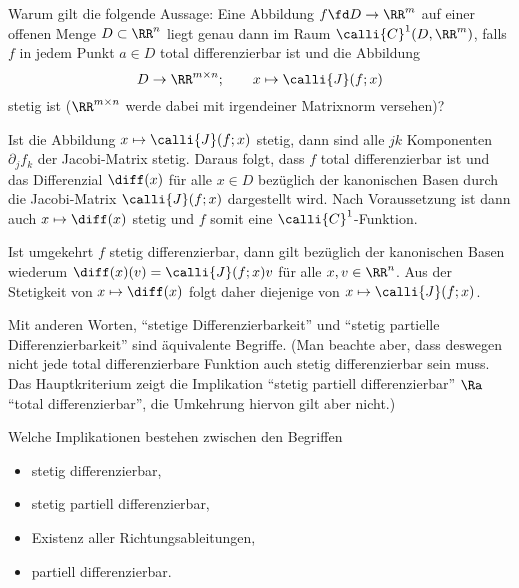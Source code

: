\begin{frage}\label{10_stet}
  Warum gilt die folgende Aussage: Eine Abbildung $f\fd D\to\RR^m$ auf 
  einer offenen Menge $D\subset\RR^n$ liegt genau dann im 
  Raum $\calli{C}^1 (D, \RR^m)$, falls $f$ in jedem Punkt 
  $a\in D$ total differenzierbar ist und die Abbildung 
  \[
  D\to \RR^{m\times n}; \qquad x \mapsto \calli{J} (f; x )
  \]
  stetig ist 
  ($\RR^{m\times n}$ werde dabei mit irgendeiner Matrixnorm versehen)?
\end{frage}

\begin{antwort}
  Ist die Abbildung $x \mapsto \calli{J} (f; x )$ stetig, dann sind  
  alle $jk$ Komponenten $\partial_j f_k$ der Jacobi-Matrix stetig. Daraus 
  folgt, dass $f$ total differenzierbar ist und das Differenzial $\diff (x)$ 
  für alle $x\in D$ bezüglich der kanonischen Basen durch die Jacobi-Matrix 
  $\calli{J}(f;x)$ dargestellt wird. Nach Voraussetzung ist 
  dann auch $x \mapsto \diff (x)$ stetig und $f$ somit eine 
  $\calli{C}^1$-Funktion. 



  Ist umgekehrt $f$ stetig differenzierbar, 
  dann gilt bezüglich der kanonischen Basen wiederum
  $\diff (x) (v) = \calli{J}(f;x) v$ für alle $x,v\in \RR^n$. Aus der 
  Stetigkeit von $x\mapsto \diff (x)$ folgt daher 
  diejenige von $x \mapsto \calli{J}(f;x)$.



  Mit anderen Worten, "`stetige Differenzierbarkeit"' 
  und "`stetig partielle Differenzierbarkeit"' 
  sind äquivalente Begriffe. 
  (Man beachte aber, dass deswegen nicht jede total differenzierbare Funktion 
  auch stetig differenzierbar sein muss. Das Hauptkriterium 
  zeigt die Implikation "`stetig partiell differenzierbar"' $\Ra$ 
  "`total differenzierbar"', die Umkehrung hiervon gilt aber nicht.)  
  \AntEnd
\end{antwort}

\begin{frage}
  Welche Implikationen bestehen zwischen den Begriffen
  {\setlength{\labelsep}{4mm}
    \begin{itemize}
    \item[\desc{i}] stetig differenzierbar,
    \item[\desc{ii}] stetig partiell differenzierbar,
    \item[\desc{iii}] Existenz aller Richtungsableitungen,
    \item[\desc{iv}] partiell differenzierbar.
    \end{itemize}}
\end{frage}

